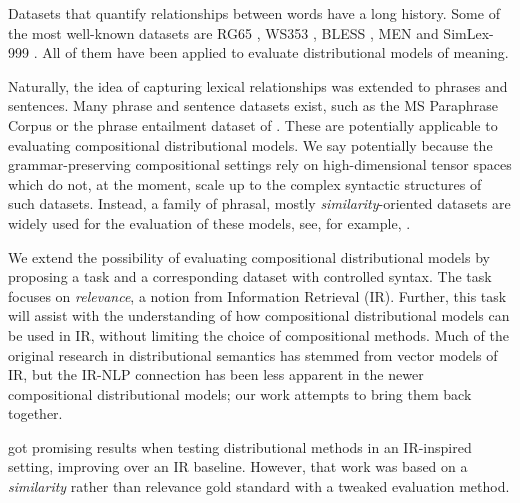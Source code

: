 Datasets that quantify relationships between words have a long history.\footnotemark{} Some of the most well-known datasets are RG65 \cite{Rubenstein:1965:CCS:365628.365657}, WS353 \cite{2002:PSC:503104.503110}, BLESS \cite{baroni-lenci:2011:GEMS}, MEN \cite{Bruni:2014:MDS:2655713.2655714} and SimLex-999 \cite{hill2014simlex}. All of them have been applied to evaluate distributional models of meaning.


Naturally, the idea of capturing lexical relationships was extended to phrases and sentences. Many phrase and sentence datasets exist, such as the MS Paraphrase Corpus \cite{dolan2005par} or the phrase entailment dataset of . These are potentially applicable to evaluating compositional distributional models. We say potentially because the grammar-preserving compositional settings \cite{baroni2014frege,DBLP:journals/corr/abs-1003-4394}  rely on high-dimensional tensor spaces which do not, at the moment, scale up to  the complex syntactic structures of such datasets. Instead, a family of phrasal, mostly \emph{similarity}-oriented datasets \cite{mitchell-lapata:2008:ACLMain,Grefenstette:2011:ESC:2145432.2145580,kartsaklis-sadrzadeh:2013:EMNLP,kartsadrqpl2014} are widely used for the evaluation of these models, see, for example, \citet{kim-demarneffe-foslerlussier:2015:VSM-NLP}.

We extend the possibility of evaluating compositional distributional models by proposing a task and a corresponding dataset  with controlled syntax. The task focuses on \emph{relevance}, a notion from Information Retrieval (IR).  Further, this task will assist with the understanding of how compositional distributional  models  can be used in IR, without limiting the choice of compositional methods. Much of the original research in distributional semantics has stemmed from vector models of IR, but the IR-NLP connection has been less apparent in  the newer compositional distributional models; our work attempts to bring them back together.

 got promising results when testing distributional methods in an IR-inspired setting, improving over an IR baseline. However, that work was based on a \emph{similarity} rather than relevance gold standard with a tweaked evaluation method.

